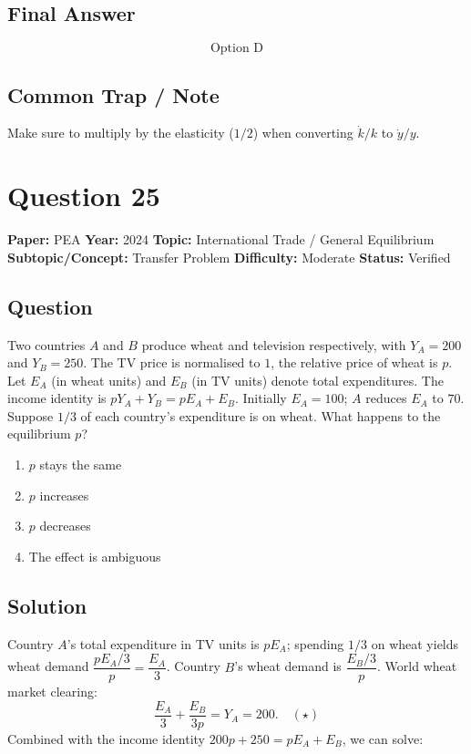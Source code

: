 \documentclass[11pt]{article}
\begin{document}
\subsection*{Final Answer}
\[
\boxed{\text{Option D}}
\]

\subsection*{Common Trap / Note}
Make sure to multiply by the elasticity ($1/2$) when converting $\dot k/k$ to $\dot y/y$.

\section*{Question 25}
\textbf{Paper:} PEA \quad \textbf{Year:} 2024 \quad \textbf{Topic:} International Trade / General Equilibrium \\
\textbf{Subtopic/Concept:} Transfer Problem \quad \textbf{Difficulty:} Moderate \quad \textbf{Status:} Verified

\subsection*{Question}
Two countries $A$ and $B$ produce wheat and television respectively, with $Y_A=200$ and $Y_B=250$. The TV price is normalised to $1$, the relative price of wheat is $p$. Let $E_A$ (in wheat units) and $E_B$ (in TV units) denote total expenditures. The income identity is $pY_A+Y_B=pE_A+E_B$. Initially $E_A=100$; $A$ reduces $E_A$ to $70$. Suppose $1/3$ of each country's expenditure is on wheat. What happens to the equilibrium $p$?
\begin{enumerate}[label=(\Alph*)]
\item $p$ stays the same
\item $p$ increases
\item $p$ decreases
\item The effect is ambiguous
\end{enumerate}

\subsection*{Solution}
Country $A$'s total expenditure in TV units is $pE_A$; spending $1/3$ on wheat yields wheat demand $\dfrac{pE_A/3}{p}=\dfrac{E_A}{3}$. Country $B$'s wheat demand is $\dfrac{E_B/3}{p}$. World wheat market clearing:
\[
\frac{E_A}{3}+\frac{E_B}{3p}=Y_A=200. \quad (\star)
\]
Combined with the income identity $200p+250=pE_A+E_B$, we can solve:
\end{document}
